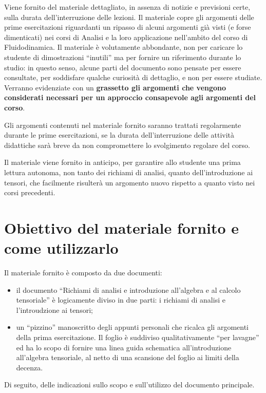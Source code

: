 \documentclass[11pt,fleqn]{article}
\begin{document}
Viene fornito del materiale dettagliato, in assenza di notizie e previsioni certe, sulla durata dell'interruzione delle lezioni. Il materiale copre gli argomenti delle prime esercitazioni riguardanti un ripasso di alcuni argomenti già visti (e forse dimenticati) nei corsi di Analisi e la loro applicazione nell'ambito del corso di Fluidodinamica. Il materiale è volutamente abbondante, non per caricare lo studente di dimostrazioni ``inutili'' ma per fornire un riferimento durante lo studio: in questo senso, alcune parti del documento sono pensate per essere consultate, per soddisfare qualche curiosità di dettaglio, e non per essere studiate. Verranno evidenziate con un \textbf{grassetto gli argomenti che vengono considerati necessari per un approccio consapevole agli argomenti del corso}.

Gli argomenti contenuti nel materiale fornito saranno trattati regolarmente durante le prime esercitazioni, se la durata dell'interruzione delle attività didattiche sarà breve da non compromettere lo svolgimento regolare del corso.

Il materiale viene fornito in anticipo, per garantire allo studente una prima lettura autonoma, non tanto dei richiami di analisi, quanto dell'introduzione ai tensori, che facilmente risulterà un argomento nuovo rispetto a quanto visto nei corsi precedenti.

\section*{Obiettivo del materiale fornito e come utilizzarlo}
Il materiale fornito è composto da due documenti:
\begin{itemize}
  \item il documento ``Richiami di analisi e introduzione all'algebra e al calcolo tensoriale'' è logicamente diviso in due parti: i richiami di analisi e l'introudzione ai tensori;
  \item un ``pizzino'' manoscritto degli appunti personali che ricalca gli argomenti della prima esercitazione. Il foglio è suddiviso qualitativamente ``per lavagne'' ed ha lo scopo di fornire una linea guida schematica all'introduzione all'algebra tensoriale, al netto di una scansione del foglio ai limiti della decenza.
\end{itemize}
%
Di seguito, delle indicazioni sullo scopo e sull'utilizzo del documento principale.
\end{document}
